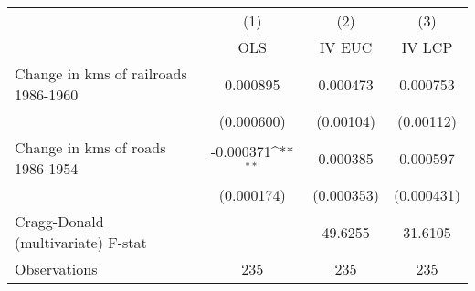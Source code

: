 {
\def\sym#1{\ifmmode^{#1}\else\(^{#1}\)\fi}
\begin{tabular}{l*{3}{c}}
\hline\hline
                &\multicolumn{1}{c}{(1)}&\multicolumn{1}{c}{(2)}&\multicolumn{1}{c}{(3)}\\
                &\multicolumn{1}{c}{OLS}&\multicolumn{1}{c}{IV EUC}&\multicolumn{1}{c}{IV LCP}\\
\hline
Change in kms of railroads 1986-1960& 0.000895         & 0.000473         & 0.000753         \\
                &(0.000600)         &(0.00104)         &(0.00112)         \\
[1em]
Change in kms of roads 1986-1954&-0.000371\sym{**} & 0.000385         & 0.000597         \\
                &(0.000174)         &(0.000353)         &(0.000431)         \\
\hline
Cragg-Donald (multivariate) F-stat&                  &  49.6255         &  31.6105         \\
Observations    &      235         &      235         &      235         \\
\hline\hline
\end{tabular}
}
